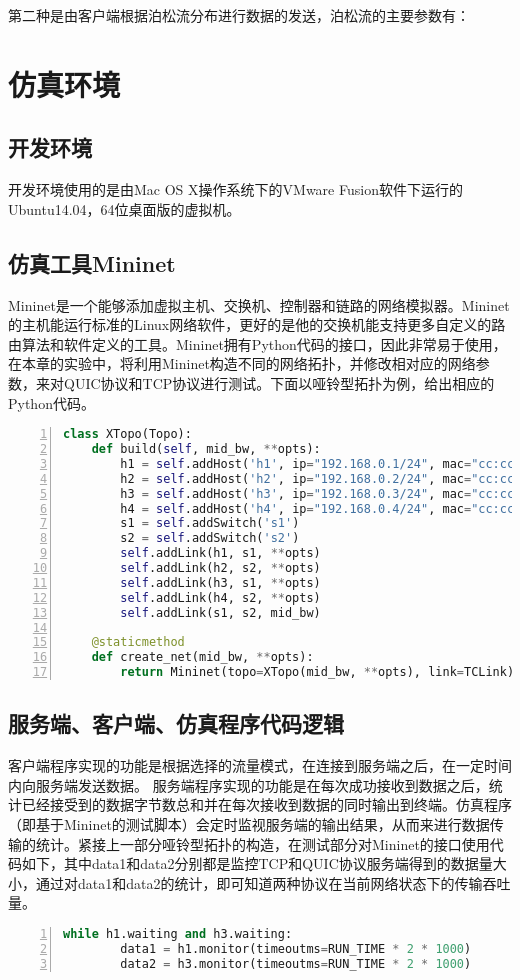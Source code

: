 第二种是由客户端根据泊松流分布进行数据的发送，泊松流的主要参数有：

\section{仿真环境}
\subsection{开发环境}
开发环境使用的是由Mac OS X操作系统下的VMware Fusion软件下运行的Ubuntu14.04，64位桌面版的虚拟机。

\subsection{仿真工具Mininet}
Mininet是一个能够添加虚拟主机、交换机、控制器和链路的网络模拟器。Mininet的主机能运行标准的Linux网络软件，更好的是他的交换机能支持更多自定义的路由算法和软件定义的工具。Mininet拥有Python代码的接口，因此非常易于使用，在本章的实验中，将利用Mininet构造不同的网络拓扑，并修改相对应的网络参数，来对QUIC协议和TCP协议进行测试。下面以哑铃型拓扑为例，给出相应的Python代码。

\begin{lstlisting}[language={python},numbers=left]
class XTopo(Topo):
    def build(self, mid_bw, **opts):
        h1 = self.addHost('h1', ip="192.168.0.1/24", mac="cc:cc:cc:cc:cc:01")
        h2 = self.addHost('h2', ip="192.168.0.2/24", mac="cc:cc:cc:cc:cc:02")
        h3 = self.addHost('h3', ip="192.168.0.3/24", mac="cc:cc:cc:cc:cc:03")
        h4 = self.addHost('h4', ip="192.168.0.4/24", mac="cc:cc:cc:cc:cc:04")
        s1 = self.addSwitch('s1')
        s2 = self.addSwitch('s2')
        self.addLink(h1, s1, **opts)
        self.addLink(h2, s2, **opts)
        self.addLink(h3, s1, **opts)
        self.addLink(h4, s2, **opts)
        self.addLink(s1, s2, mid_bw)

    @staticmethod
    def create_net(mid_bw, **opts):
        return Mininet(topo=XTopo(mid_bw, **opts), link=TCLink)
\end{lstlisting}

\subsection{服务端、客户端、仿真程序代码逻辑}
客户端程序实现的功能是根据选择的流量模式，在连接到服务端之后，在一定时间内向服务端发送数据。
服务端程序实现的功能是在每次成功接收到数据之后，统计已经接受到的数据字节数总和并在每次接收到数据的同时输出到终端。仿真程序（即基于Mininet的测试脚本）会定时监视服务端的输出结果，从而来进行数据传输的统计。紧接上一部分哑铃型拓扑的构造，在测试部分对Mininet的接口使用代码如下，其中data1和data2分别都是监控TCP和QUIC协议服务端得到的数据量大小，通过对data1和data2的统计，即可知道两种协议在当前网络状态下的传输吞吐量。
\begin{lstlisting}[language={python},numbers=left]
    while h1.waiting and h3.waiting:
        data1 = h1.monitor(timeoutms=RUN_TIME * 2 * 1000)
        data2 = h3.monitor(timeoutms=RUN_TIME * 2 * 1000)
\end{lstlisting}

